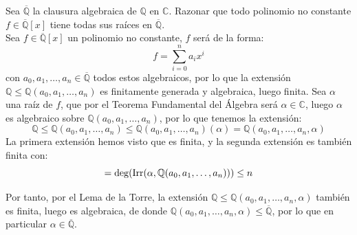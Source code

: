 \begin{ejercicio} 
    Sea $\overline{\mathbb{Q}}$ la clausura algebraica de $\mathbb{Q}$ en $\mathbb{C}$. Razonar que todo polinomio no constante $f\in \overline{\mathbb{Q}}[x]$ tiene todas sus raíces en $\overline{\mathbb{Q}}$.\\

    \noindent
    Sea $f\in \overline{\mathbb{Q}}[x]$ un polinomio no constante, $f$ será de la forma:
    \begin{equation*}
        f = \sum_{i=0}^{n}a_ix^i
    \end{equation*}
    con $a_0,a_1,\ldots,a_n\in \overline{\mathbb{Q}}$ todos estos algebraicos, por lo que la extensión $\mathbb{Q}\leq \mathbb{Q}(a_0,a_1,\ldots,a_n)$ es finitamente generada y algebraica, luego finita. Sea $\alpha$ una raíz de $f$, que por el Teorema Fundamental del Álgebra será $\alpha\in \mathbb{C}$, luego $\alpha$ es algebraico sobre $\mathbb{Q}(a_0,a_1,\ldots,a_n)$, por lo que tenemos la extensión:
    \begin{equation*}
        \mathbb{Q}\leq \mathbb{Q}(a_0,a_1,\ldots,a_n)
        \leq \mathbb{Q}(a_0,a_1,\ldots,a_n)(\alpha) = \mathbb{Q}(a_0,a_1,\ldots,a_n,\alpha)
    \end{equation*}
    La primera extensión hemos visto que es finita, y la segunda extensión es también finita con:
    \begin{equation*}
        [\mathbb{Q}(a_0,a_1,\ldots,a_n,\alpha):\mathbb{Q}(a_0,a_1,\ldots,a_n)] = \deg(\Irr(\alpha,\mathbb{Q}(a_0,a_1,\ldots,a_n))) \leq n
    \end{equation*}

    Por tanto, por el Lema de la Torre, la extensión $\mathbb{Q}\leq \mathbb{Q}(a_0,a_1,\ldots,a_n,\alpha)$ también es finita, luego es algebraica, de donde $\mathbb{Q}(a_0,a_1,\ldots,a_n,\alpha)\leq \overline{\mathbb{Q}}$, por lo que en particular $\alpha \in \overline{\mathbb{Q}}$.
\end{ejercicio}

